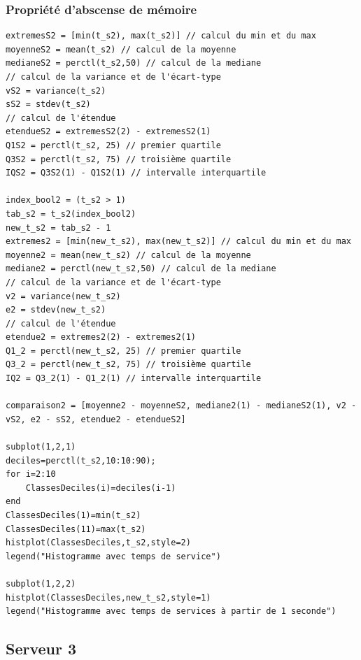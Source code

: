 \documentclass{article}
\begin{document}
\subsubsection{Propriété d'abscense de mémoire}
\begin{verbatim}
extremesS2 = [min(t_s2), max(t_s2)] // calcul du min et du max
moyenneS2 = mean(t_s2) // calcul de la moyenne
medianeS2 = perctl(t_s2,50) // calcul de la mediane
// calcul de la variance et de l'écart-type
vS2 = variance(t_s2)
sS2 = stdev(t_s2)
// calcul de l'étendue
etendueS2 = extremesS2(2) - extremesS2(1)
Q1S2 = perctl(t_s2, 25) // premier quartile
Q3S2 = perctl(t_s2, 75) // troisième quartile
IQS2 = Q3S2(1) - Q1S2(1) // intervalle interquartile

index_bool2 = (t_s2 > 1)
tab_s2 = t_s2(index_bool2)
new_t_s2 = tab_s2 - 1
extremes2 = [min(new_t_s2), max(new_t_s2)] // calcul du min et du max
moyenne2 = mean(new_t_s2) // calcul de la moyenne
mediane2 = perctl(new_t_s2,50) // calcul de la mediane
// calcul de la variance et de l'écart-type
v2 = variance(new_t_s2)
e2 = stdev(new_t_s2)
// calcul de l'étendue
etendue2 = extremes2(2) - extremes2(1)
Q1_2 = perctl(new_t_s2, 25) // premier quartile
Q3_2 = perctl(new_t_s2, 75) // troisième quartile
IQ2 = Q3_2(1) - Q1_2(1) // intervalle interquartile

comparaison2 = [moyenne2 - moyenneS2, mediane2(1) - medianeS2(1), v2 - vS2, e2 - sS2, etendue2 - etendueS2]

subplot(1,2,1)
deciles=perctl(t_s2,10:10:90);
for i=2:10
    ClassesDeciles(i)=deciles(i-1)
end
ClassesDeciles(1)=min(t_s2)
ClassesDeciles(11)=max(t_s2)
histplot(ClassesDeciles,t_s2,style=2)
legend("Histogramme avec temps de service")

subplot(1,2,2)
histplot(ClassesDeciles,new_t_s2,style=1)
legend("Histogramme avec temps de services à partir de 1 seconde")
\end{verbatim}

\subsection{Serveur 3}
\end{document}
